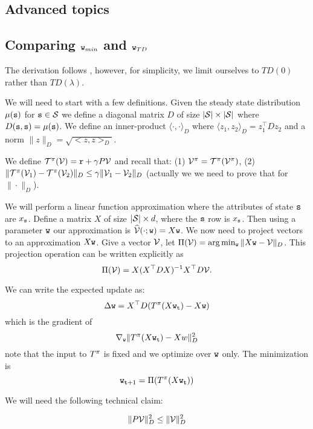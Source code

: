 \begin{leftbar}
\section{Advanced topics}
\label{sec:FA-Advanced}

\subsection{Comparing ${\tt w}_{min}$ and ${\tt w}_{TD}$}

The derivation follows \cite{TsitsiklisVR97}, however, for
simplicity, we limit ourselves to $TD(0)$ rather than $TD(\lambda)$.

We will need to start with a few definitions. Given the steady state
distribution $\mu({\tt s})$ for ${\tt s}\in \mathcal{S}$ we define a
diagonal matrix $D$ of size $|\mathcal{S}|\times|\mathcal{S}|$ where
$D({\tt s},{\tt s})=\mu({\tt s})$. We define an inner-product
$\langle\cdot,\cdot\rangle_D$ where $\langle
z_1,z_2\rangle_D=z_1^\top Dz_2$ and a norm $\|z\|_D=\sqrt{<z,z>_D}$.

We define $\mathcal{T}^\pi(\mathcal{V})= {\tt r} + \gamma P\mathcal{V}$ and recall
that: (1) $\mathcal{V}^\pi = \mathcal{T}^\pi(\mathcal{V}^\pi)$, (2)
$\|\mathcal{T}^\pi(\mathcal{V}_1)-\mathcal{T}^\pi(\mathcal{V}_2)\|_D\leq \gamma
\|\mathcal{V}_1-\mathcal{V}_2\|_D$ (actually we we need to prove that for
$\|\cdot\|_D$).

We will perform a linear function approximation where the attributes
of state ${\tt s}$ are $x_{\tt s}$. Define a matrix $X$ of size
$|\mathcal{S}|\times d$, where the ${\tt s}$ row is $x_{\tt s}$. Then
using a parameter ${\tt w}$ our approximation is
$\widehat{\mathcal{V}}(\cdot;{\tt w})=X{\tt w}$. We now need to project
vectors to an approximation $X{\tt w}$. Give a vector $\mathcal{V}$, let
$\Pi(\mathcal{V})=\arg\min_{\tt w} \|X{\tt w}-\mathcal{V}\|_D$. This projection
operation can be written explicitly as
\[
\Pi(\mathcal{V})=X(X^\top DX)^{-1}X^\top D \mathcal{V}.
\]


We can write the expected update as:
\[
\Delta {\tt w}= X^\top D(T^\pi(X{\tt w}_{\tt t})-X{\tt w})
\]
which is the gradient of
\[
\nabla_{\tt w} \|T^\pi(X{\tt w}_{\tt t})-Xw\|_D^2
\]
note that the input to $T^\pi$ is fixed and we optimize over
${\tt w}$ only. The minimization is
\[
{\tt w}_{{\tt t}+1}=\Pi(T^\pi(X{\tt w}_{\tt t}))
\]

We will need the following technical claim:
\begin{claim}
\[
\|P\mathcal{V}\|_D^2\leq \|\mathcal{V}\|_D^2
\]
\end{claim}


\end{leftbar}
